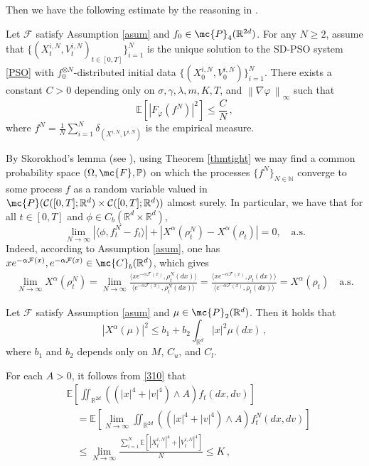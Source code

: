 \documentclass{ims9x6}
\newcommand{\R}{{\mathbb R}}
\newcommand{\CR}{\mathcal{C}([0,T];\mathbb{R}^d)}
\newcommand{\EE}{\mathbb{E}}
\newcommand{\TE}{\mathcal{F}}
\newcommand{\RR}{\mathbb{R}}
\newcommand{\PP}{\mathbb{P}}
\newcommand{\la}{\langle}
\newcommand{\ra}{\rangle}
\newcommand{\norm}[1]{\left\lVert#1 \, \right\rVert}
\begin{document}
Then we have the following estimate by the reasoning in  \cite[Proposition 3.2]{huang2021mean1}.
\begin{lemma}\label{prop}
	Let $\TE$ satisfy Assumption \ref{asum} and $f_0\in \mc{P}_4(\RR^{2d})$. For any $N\geq 2$, assume that $\{(X_t^{i,N},V_t^{i,N})_{t\in[0,T]}\}_{i=1}^N$ is the unique solution to the SD-PSO system \eqref{PSO} with $f_0^{\otimes N}$-distributed initial data $\{(X_0^{i,N},V_0^{i,N})\}_{i=1}^N$. There exists a constant $C>0$ depending only on $\sigma,\gamma,\lambda,m,K,T$, and $\norm{\nabla\varphi}_\infty$ such that
	\begin{equation}
	\EE[|F_{\varphi}(f^N)|^2]\leq \frac{C}{N}\,,
	\end{equation}
	where $f^N=\frac{1}{N}\sum_{i=1}^N\delta_{(X^{i,N},V^{i,N})}$ is the empirical measure.
\end{lemma}
By Skorokhod's lemma (see \cite[Theorem 6.7 on page
70]{billingsley2013convergence}),   using Theorem \ref{thmtight} we may find a common probability space $(\Omega,\mc{F},\PP)$ on which the processes $\{f^N\}_{N\in\mathbb N}$ converge to some process $f$ as a random variable valued in $\mc{P}(\CR\times\CR)$ almost surely. In particular, we have that for all $t\in [0,T]$ and $\phi\in C_b(\RR^d\times \RR^d)$,
\begin{equation}\label{310}
\lim_{N\rightarrow \infty} |\la \phi,f_t^N-f_t\ra| + \left|X^\alpha(\rho^N_t)-X^\alpha(\rho_t)\right|= 0,\quad \text{a.s.}
\end{equation}
Indeed, according to Assumption \ref{asum}, one has  $xe^{-\alpha \TE(x)}, e^{-\alpha \TE(x)} \in \mc{C}_b(
\R^d)$, which gives
{\small \begin{align*}
\lim_{N\rightarrow \infty} X^\alpha(\rho_t^N) =	\lim_{N\rightarrow \infty} \frac{\la xe^{-\alpha\TE(x)},\rho_t^N(dx)\ra}{\la e^{-\alpha\TE(x)}, \rho_t^N(dx)\ra}=\frac{\la xe^{-\alpha\TE(x)},\rho_t(dx)\ra}{\la e^{-\alpha\TE(x)}, \rho_t(dx)\ra}=X^\alpha(\rho_t)\quad \text{a.s.} 
\end{align*}}
\begin{lemma}{\cite[Lemma 3.3]{carrillo2018analytical}}\label{lemXa}
	Let $\TE$ satisfy Assumption \ref{asum}  and $\mu\in \mc{P}_2(\R^d)$. Then  it holds that
	\begin{equation}
	|X^\alpha(\mu)|^2 \leq b_1+b_2\int_{\RR^d}|x|^2\mu(dx)\,,
	\end{equation}
	where $b_1$ and $b_2$ depends only on $M$, $C_u$, and $C_l$.
\end{lemma}
For each $A>0$, it follows from \eqref{310} that
\begin{align*}
&\EE\left[\iint_{\R^{2d}}((|x|^4+|v|^4)\wedge A)f_t(dx,dv)\right]\\
&\quad=\EE\left[\lim_{N\rightarrow \infty}\iint_{\R^{2d}}((|x|^4+|v|^4)\wedge A)f_t^N(dx,dv)\right]\\
&\quad\leq \lim_{N\rightarrow \infty}\frac{\sum_{i=1}^{N}\EE[|X_t^{i,N}|^4+|V_t^{i,N}|^4]}{N}\leq K\,,
\end{align*}
\end{document}
